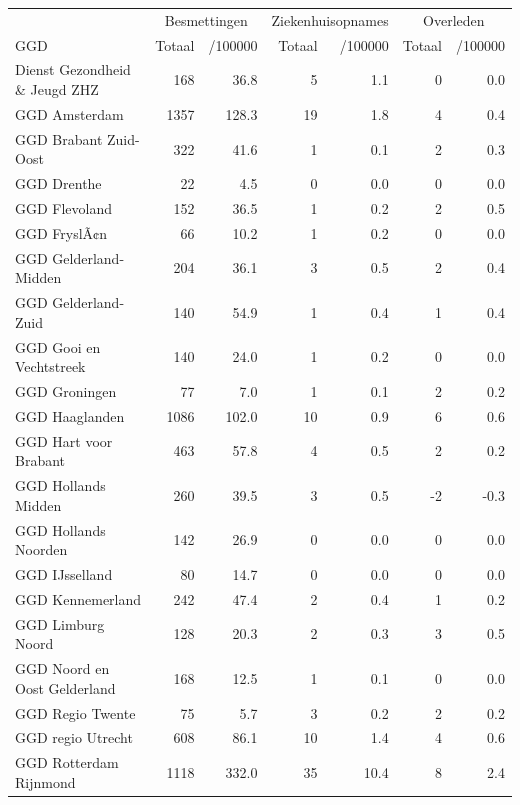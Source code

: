 \documentclass[
  english,
  man,floatsintext]{apa6}
\begin{document}
\begin{table}[H]
\centering\begingroup\fontsize{10}{12}\selectfont

\begin{threeparttable}
\begin{tabular}{lrrrrrr}
\toprule
\multicolumn{1}{c}{ } & \multicolumn{2}{c}{Besmettingen} & \multicolumn{2}{c}{Ziekenhuisopnames} & \multicolumn{2}{c}{Overleden} \\
\cmidrule(l{3pt}r{3pt}){2-3} \cmidrule(l{3pt}r{3pt}){4-5} \cmidrule(l{3pt}r{3pt}){6-7}
GGD & Totaal & /100000 & Totaal & /100000 & Totaal & /100000\\
\midrule
Dienst Gezondheid \& Jeugd ZHZ & 168 & 36.8 & 5 & 1.1 & 0 & 0.0\\
GGD Amsterdam & 1357 & 128.3 & 19 & 1.8 & 4 & 0.4\\
GGD Brabant Zuid-Oost & 322 & 41.6 & 1 & 0.1 & 2 & 0.3\\
GGD Drenthe & 22 & 4.5 & 0 & 0.0 & 0 & 0.0\\
GGD Flevoland & 152 & 36.5 & 1 & 0.2 & 2 & 0.5\\
GGD FryslÃ¢n & 66 & 10.2 & 1 & 0.2 & 0 & 0.0\\
GGD Gelderland-Midden & 204 & 36.1 & 3 & 0.5 & 2 & 0.4\\
GGD Gelderland-Zuid & 140 & 54.9 & 1 & 0.4 & 1 & 0.4\\
GGD Gooi en Vechtstreek & 140 & 24.0 & 1 & 0.2 & 0 & 0.0\\
GGD Groningen & 77 & 7.0 & 1 & 0.1 & 2 & 0.2\\
GGD Haaglanden & 1086 & 102.0 & 10 & 0.9 & 6 & 0.6\\
GGD Hart voor Brabant & 463 & 57.8 & 4 & 0.5 & 2 & 0.2\\
GGD Hollands Midden & 260 & 39.5 & 3 & 0.5 & -2 & -0.3\\
GGD Hollands Noorden & 142 & 26.9 & 0 & 0.0 & 0 & 0.0\\
GGD IJsselland & 80 & 14.7 & 0 & 0.0 & 0 & 0.0\\
GGD Kennemerland & 242 & 47.4 & 2 & 0.4 & 1 & 0.2\\
GGD Limburg Noord & 128 & 20.3 & 2 & 0.3 & 3 & 0.5\\
GGD Noord en Oost Gelderland & 168 & 12.5 & 1 & 0.1 & 0 & 0.0\\
GGD Regio Twente & 75 & 5.7 & 3 & 0.2 & 2 & 0.2\\
GGD regio Utrecht & 608 & 86.1 & 10 & 1.4 & 4 & 0.6\\
GGD Rotterdam Rijnmond & 1118 & 332.0 & 35 & 10.4 & 8 & 2.4\\

\end{tabular}
\end{threeparttable}
\end{table}
\end{document}
